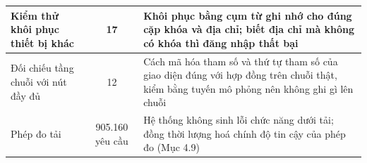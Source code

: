 \begin{longtable}{|p{3.3cm}|c|p{8.4cm}|}
Kiểm thử khôi phục thiết bị khác
& 17
& Khôi phục bằng cụm từ ghi nhớ cho đúng cặp khóa và địa chỉ; biết địa chỉ mà không có khóa thì đăng nhập thất bại
\\ \hline

Đối chiếu tầng chuỗi với nút đầy đủ
& 12
& Cách mã hóa tham số và thứ tự tham số của giao diện đúng với hợp đồng trên chuỗi thật, kiểm bằng tuyến mô phỏng nên không ghi gì lên chuỗi
\\ \hline

Phép đo tải
& 905.160 yêu cầu
& Hệ thống không sinh lỗi chức năng dưới tải; đồng thời lượng hoá chính độ tin cậy của phép đo (Mục 4.9)
\\ \hline

\end{longtable}
